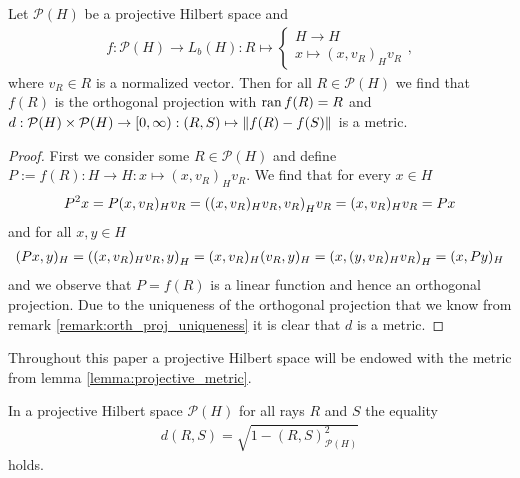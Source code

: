 \begin{lemma} \label{lemma:projective_metric}
	Let $\mathcal{P}(H)$ be a projective Hilbert space and
	\begin{align*}
		f: \mathcal{P}(H) \to L_b(H): R \mapsto 
		\begin{cases}
			H \to H \\
			x \mapsto (x,v_R)_H v_R
		\end{cases},
	\end{align*} 
	where $v_R \in R$ is a normalized vector. Then for all $R \in \mathcal{P}(H)$ we find that $f(R)$ is the orthogonal projection with $\operatorname{ran} f(R) = R$ and $d: \mathcal{P}(H) \times \mathcal{P}(H) \to [0, \infty): (R,S) \mapsto {\left \| f(R) - f(S) \right \|}_{}$ is a metric. 
\end{lemma}

\begin{proof}
	First we consider some $R \in \mathcal{P}(H)$ and define $P := f(R): H \to H: x \mapsto (x,v_R)_H v_R$. We find that for every $x \in H$
	\begin{align*}
		P^2x = P(x, v_R)_H v_R = {\left ( (x, v_R)_H v_R, v_R \right )}_H v_R = (x,v_R)_H v_R = Px
	\end{align*}
	and for all $x,y \in H$
	\begin{align*}
		(Px, y)_H = {\left ( (x, v_R)_H v_R, y \right )}_H = (x, v_R)_H (v_R, y)_H = {\left ( x, (y, v_R)_H v_R \right )}_H = (x, Py)_H
	\end{align*}
	and we observe that $P = f(R)$ is a linear function and hence an orthogonal projection. Due to the uniqueness of the orthogonal projection that we know from remark \ref{remark:orth_proj_uniqueness} it is clear that $d$ is a metric.
\end{proof}


\begin{remark}
	Throughout this paper a projective Hilbert space will be endowed with the metric from lemma \ref{lemma:projective_metric}. 
\end{remark}


\begin{lemma} \label{lemma:metric_representation}
	In a projective Hilbert space $\mathcal{P}(H)$ for all rays $R$ and $S$ the equality 
	\begin{align*}
		d(R,S) = \sqrt{1 - (R,S)_{\mathcal{P}(H)}^2}
	\end{align*}
	holds.
\end{lemma}

